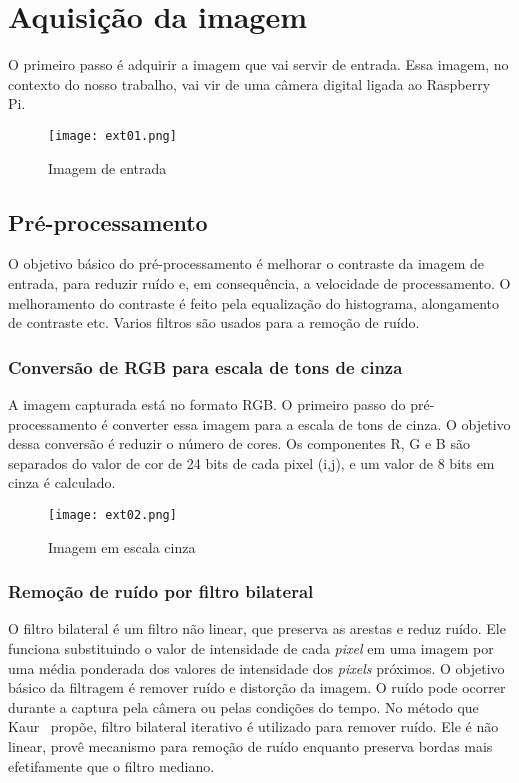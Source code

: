 \section{Aquisição da imagem}

O primeiro passo é adquirir a imagem que vai servir de entrada. Essa imagem, no
contexto do nosso trabalho, vai vir de uma câmera digital ligada ao Raspberry
Pi.

\begin{figure}[H]
	\centering
	\texttt{[image: ext01.png]}
	\caption{Imagem de entrada}
	\label{fig:ext_input_image}
\end{figure}

\subsection{Pré-processamento}

O objetivo básico do pré-processamento é melhorar o contraste da imagem de
entrada, para reduzir ruído e, em consequência, a velocidade de
processamento. O melhoramento do contraste é feito pela equalização do
histograma, alongamento de contraste etc. Varios filtros são usados para a
remoção de ruído.

\subsubsection{Conversão de RGB para escala de tons de cinza}

A imagem capturada está no formato RGB\@. O primeiro passo do pré-processamento é
converter essa imagem para a escala de tons de cinza. O objetivo dessa conversão é reduzir
o número de cores. Os componentes R, G e B são separados do valor de cor de 24
bits de cada pixel (i,j), e um valor de 8 bits em cinza é calculado.

\begin{figure}[H]
	\centering
	\texttt{[image: ext02.png]}
	\caption{Imagem em escala cinza}
	\label{fig:ext_gray_scale}
\end{figure}

\subsubsection{Remoção de ruído por filtro bilateral}

O filtro bilateral é um filtro não linear, que preserva as arestas e reduz ruído.
Ele funciona substituindo o valor de intensidade de cada \emph{pixel} em uma imagem
por uma média ponderada dos valores de intensidade dos \emph{pixels} próximos.
O objetivo básico da filtragem é remover ruído e distorção da imagem. O ruído
pode ocorrer durante a captura pela câmera ou pelas condições do tempo. No
método que Kaur~\cite{kaur2014efficient} propõe, filtro bilateral iterativo é
utilizado para remover ruído. Ele é não linear, provê mecanismo para remoção de
ruído enquanto preserva bordas mais efetifamente que o filtro mediano.

